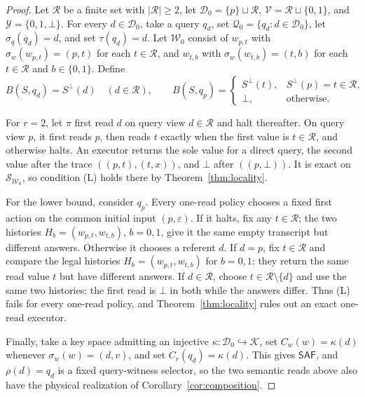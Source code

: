 \documentclass[11pt]{article}
\theoremstyle{definition}
\theoremstyle{plain}
\newcommand{\Dom}{\mathcal{D}}
\newcommand{\Wr}{\mathcal{W}}
\newcommand{\Qu}{\mathcal{Q}}
\newcommand{\Ky}{\mathcal{K}}
\newcommand{\Va}{\mathcal{V}}
\newcommand{\bt}{\bot}
\newcommand{\semw}{\sigma_w}
\newcommand{\semq}{\sigma_q}
\newcommand{\SAF}{\mathsf{SAF}}
\begin{document}
\begin{proof}
Let \(\mathcal R\) be a finite set with \(\lvert\mathcal R\rvert\geq2\),
let \(\Dom_0=\{p\}\sqcup\mathcal R\),
\(\Va=\mathcal R\sqcup\{0,1\}\), and
\(\mathcal Y=\{0,1,\bt\}\).  For every \(d\in\Dom_0\), take a query
\(q_d\), set \(\Qu_0=\{q_d:d\in\Dom_0\}\), let \(\semq(q_d)=d\), and
set \(\tau(q_d)=d\).  Let \(\Wr_0\) consist of \(w_{p,t}\) with
\(\semw(w_{p,t})=(p,t)\) for each
\(t\in\mathcal R\), and \(w_{t,b}\) with
\(\semw(w_{t,b})=(t,b)\) for each \(t\in\mathcal R\) and
\(b\in\{0,1\}\).  Define
\[
 B(S,q_d)=S^{\bt}(d)\quad(d\in\mathcal R),
 \qquad
 B(S,q_p)=
 \begin{cases}
   S^{\bt}(t), & S^{\bt}(p)=t\in\mathcal R,\\
   \bt, & \text{otherwise.}
 \end{cases}
\]

For \(r=2\), let \(\pi\) first read \(d\) on query view \(d\in\mathcal R\)
and halt thereafter.  On query view \(p\), it first reads \(p\), then reads
\(t\) exactly when the first value is \(t\in\mathcal R\), and otherwise
halts.  An executor returns the sole value for a direct query, the second
value after the trace \(((p,t),(t,x))\), and \(\bt\) after \(((p,\bt))\).
It is exact on \(\mathcal S_{\Wr_0}\), so condition (L) holds there by
Theorem~\ref{thm:locality}.

For the lower bound, consider \(q_p\).  Every one-read policy chooses a
fixed first action on the common initial input \((p,\varepsilon)\).  If it
halts, fix any \(t\in\mathcal R\); the two histories
\(H_b=(w_{p,t},w_{t,b})\), \(b=0,1\), give it the same empty transcript but
different answers.  Otherwise it chooses a
referent \(d\).  If \(d=p\), fix \(t\in\mathcal R\) and compare the legal histories
\(H_b=(w_{p,t},w_{t,b})\) for \(b=0,1\): they return the same read value
\(t\) but have different answers.  If \(d\in\mathcal R\), choose
\(t\in\mathcal R\setminus\{d\}\) and use the same two histories: the
first read is \(\bt\) in both while the answers differ.  Thus (L) fails for
every one-read policy, and Theorem~\ref{thm:locality} rules out an exact
one-read executor.

Finally, take a key space admitting an injective
\(\kappa:\Dom_0\hookrightarrow\Ky\), set \(C_w(w)=\kappa(d)\) whenever
\(\semw(w)=(d,v)\), and set \(C_r(q_d)=\kappa(d)\).  This gives \(\SAF\),
and \(\rho(d)=q_d\) is a fixed query-witness selector, so the two semantic
reads above also have the physical realization of
Corollary~\ref{cor:composition}.
\end{proof}
\end{document}
